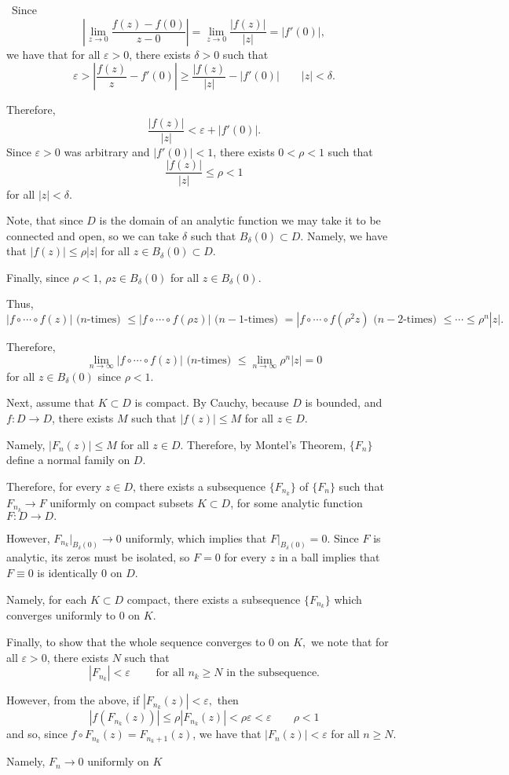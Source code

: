 \documentclass[12pt]{Homework}
\begin{document}
\begin{solution}$\,$
Since $$\left|\lim_{z\to0}\frac{f(z)-f(0)}{z-0}\right|=\lim_{z\to0}\frac{|f(z)|}{|z|}=|f'(0)|,$$ we have that for all $\varepsilon>0$, there exists $\delta>0$ such that $$\varepsilon>\left|\frac{f(z)}{z}-f'(0)\right|\ge\frac{|f(z)}{|z|}-|f'(0)|\qquad |z|<\delta.$$

Therefore, $$\frac{|f(z)|}{|z|}<\varepsilon+|f'(0)|.$$ Since $\varepsilon>0$ was arbitrary and $|f'(0)|<1$, there exists $0<\rho<1$ such that $$\frac{|f(z)|}{|z|}\le\rho<1$$ for all $|z|<\delta.$

Note, that since $D$ is the domain of an analytic function we may take it to be connected and open, so we can take $\delta$ such that $B_\delta(0)\subset D$. Namely, we have that $|f(z)|\le \rho|z|$ for all $z\in B_\delta(0)\subset D.$

Finally, since $\rho<1$, $\rho z\in B_\delta(0)$ for all $z\in B_\delta(0).$

Thus, $$|f\circ\cdots\circ f(z)|\text{ (}n\text{-times) }\le |f\circ\cdots\circ f(\rho z)|\text{ (}n-1\text{-times) }=|f\circ\cdots\circ f(\rho^2 z)\text{ (}n-2\text{-times) }\le\cdots\le \rho^n|z|.$$

Therefore, $$\lim_{n\to\infty}|f\circ\cdots\circ f(z)|\text{ (}n\text{-times) }\le \lim_{n\to\infty}\rho^n|z|=0$$ for all $z\in B_\delta(0)$ since $\rho<1.$

Next, assume that $K\subset D$ is compact. By Cauchy, because $D$ is bounded, and $f:D\to D$, there exists $M$ such that $|f(z)|\le M$ for all $z\in D.$

Namely, $|F_n(z)|\le M$ for all $z\in D.$ Therefore, by Montel's Theorem, $\{F_n\}$ define a normal family on $D.$

Therefore, for every $z\in D$, there exists a subsequence $\{F_{n_k}\}$ of $\{F_n\}$ such that $F_{n_k}\to F$ uniformly on compact subsets $K\subset D$, for some analytic function $F:D\to D.$

However, $F_{n_k}|_{B_\delta(0)}\to0$ uniformly, which implies that $F|_{B_\delta(0)}=0$. Since $F$ is analytic, its zeros must be isolated, so $F=0$ for every $z$ in a ball implies that $F\equiv0$ is identically $0$ on $D.$

Namely, for each $K\subset D$ compact, there exists a subsequence $\{F_{n_k}\}$ which converges uniformly to $0$ on $K.$

Finally, to show that the whole sequence converges to $0$ on $K,$ we note that for all $\varepsilon>0$, there exists $N$ such that $$|F_{n_k}|<\varepsilon\qquad\text{ for all }n_k\ge N\text{ in the subsequence}.$$

However, from the above, if $|F_{n_k}(z)|<\varepsilon,$ then $$|f(F_{n_k}(z))|\le \rho|F_{n_k}(z)|<\rho\varepsilon<\varepsilon\qquad \rho<1$$ and so, since $f\circ F_{n_k}(z)=F_{n_k+1}(z)$, we have that $|F_n(z)|<\varepsilon$ for all $n\ge N$.

Namely, $F_n\to0$ uniformly on $K$
\end{solution}
\newpage
\end{document}
